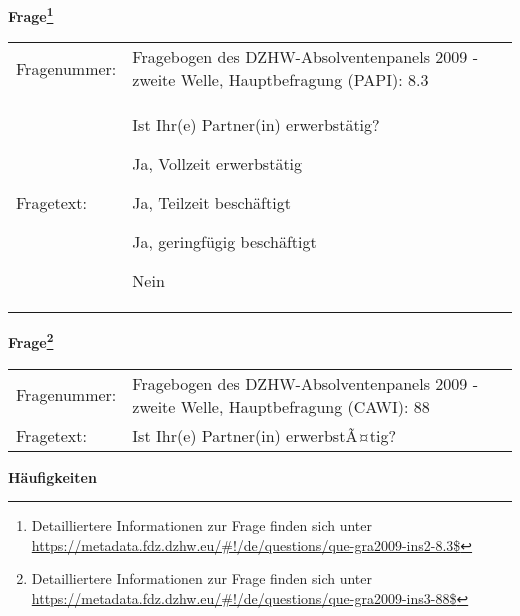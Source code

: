 				\vspace*{0.5cm}
                \noindent\textbf{Frage\footnote{Detailliertere Informationen zur Frage finden sich unter
		              \url{https://metadata.fdz.dzhw.eu/\#!/de/questions/que-gra2009-ins2-8.3$}}}\\
				\begin{tabularx}{\hsize}{@{}lX}
					Fragenummer: &
					  Fragebogen des DZHW-Absolventenpanels 2009 - zweite Welle, Hauptbefragung (PAPI):
					  8.3
 \\
					Fragetext: & Ist Ihr(e) Partner(in) erwerbstätig?\par  Ja, Vollzeit erwerbstätig\par  Ja, Teilzeit beschäftigt\par  Ja, geringfügig beschäftigt\par  Nein \\
				\end{tabularx}
				\vspace*{0.5cm}
                \noindent\textbf{Frage\footnote{Detailliertere Informationen zur Frage finden sich unter
		              \url{https://metadata.fdz.dzhw.eu/\#!/de/questions/que-gra2009-ins3-88$}}}\\
				\begin{tabularx}{\hsize}{@{}lX}
					Fragenummer: &
					  Fragebogen des DZHW-Absolventenpanels 2009 - zweite Welle, Hauptbefragung (CAWI):
					  88
 \\
					Fragetext: & Ist Ihr(e) Partner(in) erwerbstÃ¤tig? \\
				\end{tabularx}





        		\vspace*{0.5cm}
                \noindent\textbf{Häufigkeiten}

